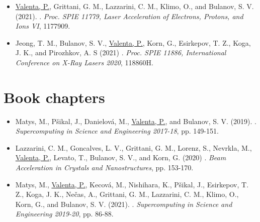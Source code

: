 \documentclass[10pt, a4paper, twoside, openright]{report}
\newcommand{\link}[3][blue]{\href{#2}{\color{#1}{#3}}}%
\begin{document}
\begin{itemize}
	\item \underline{Valenta, P.}, Grittani, G. M., Lazzarini, C. M., Klimo, O., and Bulanov, S. V. (2021). \link{http://dx.doi.org/10.1117/12.2589222}{Ring-shaped electron beams from laser-wakefield accelerator}. \textit{Proc. SPIE 11779, Laser Acceleration of Electrons, Protons, and Ions VI}, 1177909.
	
	\item Jeong, T. M., Bulanov, S. V., \underline{Valenta, P.}, Korn, G., Esirkepov, T. Z., Koga, J. K., and Pirozhkov, A. S (2021) \link{http://dx.doi.org/10.1117/12.2592047}{Ultra-strong attosecond laser focus produced by a relativistic-flying parabolic mirror}. \textit{Proc. SPIE 11886, International Conference on X-Ray Lasers 2020}, 118860H.
	
\end{itemize}

\section{Book chapters \label{sec:book_chapters}}

\begin{itemize}
	
	\item Matys, M., Pšikal, J., Danielová, M., \underline{Valenta, P.}, and Bulanov, S. V. (2019). \link{https://www.it4i.cz/cs/file/abd1875ff7d0e6f59799c4f470545516/173/Supercomputing-in-Science-and-Engineering_preview.pdf}{Laser-driven ion acceleration using cryogenic hydrogen targets}. \textit{Supercomputing in Science and Engineering 2017-18}, pp. 149-151.
	
	\item Lazzarini, C. M., Goncalves, L. V., Grittani, G. M., Lorenz, S., Nevrkla, M., \underline{Valenta, P.}, Levato, T., Bulanov, S. V., and Korn, G. (2020) \link{http://dx.doi.org/10.1142/9789811217135_0010}{Electron acceleration at ELI Beamlines: towards high-energy and high-repetition-rate accelerators}. \textit{Beam Acceleration in Crystals and Nanostructures}, pp. 153-170.
	
	\item Matys, M., \underline{Valenta, P.}, Kecová, M., Nishihara, K., Pšikal, J., Esirkepov, T. Z., Koga, J. K., Nečas, A., Grittani, G. M., Lazzarini, C. M., Klimo, O., Korn, G., and Bulanov, S. V. (2021). \link{https://www.it4i.cz/file/be151db89e56452e36511f5410126441/6419/Supercomputing\%20in\%20Science\%20and\%20Engineering\%202019-2020.pdf}{Laser-driven acceleration of charged particles}. \textit{Supercomputing in Science and Engineering 2019-20}, pp. 86-88.
	
\end{itemize}
\end{document}
